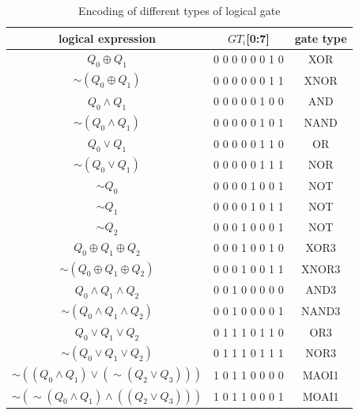 \documentclass[final,5p,times,twocolumn]{elsarticle}
\begin{document}
\begin{table}[h]
    \caption{Encoding of different types of logical gate}\label{tab3}%
    \begin{tabular}{|c|c|c|}
        \hline
        logical expression                                   & $GT_i$[0:7]     & gate type \\
        \hline
        $Q_0 \oplus Q_1$                                     & 0 0 0 0 0 0 1 0 & XOR       \\
        $\sim (Q_0 \oplus Q_1)$                              & 0 0 0 0 0 0 1 1 & XNOR      \\
        $Q_0 \land Q_1$                                      & 0 0 0 0 0 1 0 0 & AND       \\
        $\sim (Q_0 \land Q_1)$                               & 0 0 0 0 0 1 0 1 & NAND      \\
        $Q_0 \lor Q_1$                                       & 0 0 0 0 0 1 1 0 & OR        \\
        $\sim (Q_0 \lor Q_1)$                                & 0 0 0 0 0 1 1 1 & NOR       \\
        $\sim Q_0$                                           & 0 0 0 0 1 0 0 1 & NOT       \\
        $\sim Q_1$                                           & 0 0 0 0 1 0 1 1 & NOT       \\
        $\sim Q_2$                                           & 0 0 0 1 0 0 0 1 & NOT       \\
        $Q_0 \oplus Q_1 \oplus Q_2$                          & 0 0 0 1 0 0 1 0 & XOR3      \\
        $\sim (Q_0 \oplus Q_1 \oplus Q_2)$                   & 0 0 0 1 0 0 1 1 & XNOR3     \\
        $Q_0 \land Q_1 \land Q_2$                            & 0 0 1 0 0 0 0 0 & AND3      \\
        $\sim (Q_0 \land Q_1 \land Q_2)$                     & 0 0 1 0 0 0 0 1 & NAND3     \\
        $Q_0 \lor Q_1 \lor Q_2$                              & 0 1 1 1 0 1 1 0 & OR3       \\
        $\sim (Q_0 \lor Q_1 \lor Q_2)$                       & 0 1 1 1 0 1 1 1 & NOR3      \\
        $\sim ((Q_0 \land Q_1) \lor (\sim (Q_2 \lor Q_3)))$  & 1 0 1 1 0 0 0 0 & MAOI1     \\
        $\sim (\sim (Q_0 \land Q_1) \land ((Q_2 \lor Q_3)))$ & 1 0 1 1 0 0 0 1 & MOAI1     \\
        \hline
    \end{tabular}
\end{table}
\end{document}
